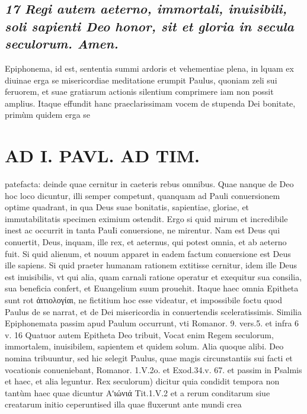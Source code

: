 \documentclass{article}
\begin{document}
\begin{pages}
\subsection*{\textit{17 Regi autem aeterno, immortali, inuisibili, soli sapienti Deo honor, sit et gloria in secula seculorum. Amen. }}\pstart Epiphonema, id est, sententia summi ardoris et vehementiae plena, in lquam ex diuinae erga se misericordiae meditatione erumpit Paulus, quoniam zeli sui feruorem, et suae gratiarum actionis silentium comprimere iam non possit amplius. Itaque effundit hanc praeclarissimam vocem de stupenda Dei bonitate, primùm quidem erga se  \pend
\section*{AD I. PAVL. AD TIM. }
\marginpar{[ p.30 ]}\pstart patefacta: deinde quae cernitur in caeteris rebus omnibus. Quae nanque de Deo hoc loco dicuntur, illi semper competunt, quanquam ad Pauli conuersionem optime quadrant, in qua Deus suae bonitatis, sapientiae, gloriae, et immutabilitatis specimen eximium ostendit. Ergo si quid mirum et incredibile inest ac occurrit in tanta PauIi conuersione, ne mirentur. Nam est Deus qui conuertit, Deus, inquam, ille rex, et aeternus, qui potest omnia, et ab aeterno fuit. Si quid alienum, et nouum apparet in eadem factum conuersione est Deus ille sapiens. Si quid praeter humanam rationem extitisse cernitur, idem ille Deus est inuisibilis, vt qui alia, quam carnali ratione operatur et exequitur sua consilia, sua beneficia confert, et Euangelium suum prouehit. Itaque haec omnia Epitheta sunt rot ἀιτιολογίαι, ne fictitium hoc esse videatur, et impossibile foctu quod Paulus de se narrat, et de Dei misericordia in conuertendis sceleratissimis.  \pend\pstart Similia Epiphonemata passim apud Paulum occurrunt, vti Romanor. 9. vers.5. et infra 6 v. 16  \pend\pstart Quatuor autem Epitheta Deo tribuit, Vocat enim Regem seculorum, immortalem, inuisibilem, sapientem et quidem solum. Alia quoque alibi. Deo nomina tribuuntur, sed hic selegit Paulus, quae magis circunstantiis sui facti et vocationis conueniebant, Romanor. 1.V.2o. et Exod.34.v. 67. et passim in Psalmis et haec, et alia leguntur.  \pend\pstart Rex seculorum) dicitur quia condidit tempora non tantùm haec quae dicuntur Αʹιώνιά  Tit.1.V.2 et a rerum conditarum siue creatarum initio ceperuntised illa quae fluxerunt ante mundi crea\pend

\end{pages}
\end{document}
